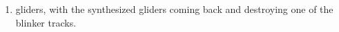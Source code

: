 \begin{multicols}{2}
\begin{problem}
\begin{enumerate}[label=\bf\color{ocre}(\alph*)]
			\item {} gliders, with the synthesized gliders coming back and destroying one of the blinker tracks.
		\end{enumerate}
	\end{problem}

\end{multicols}
